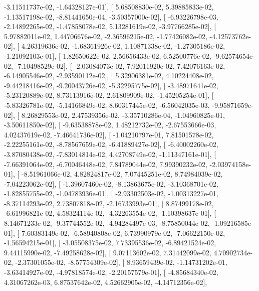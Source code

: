 \documentclass{article}
\begin{document}
         -3.11511737e-02,  -1.64328127e-01],
       [  5.68508830e-02,   5.39885833e-02,  -1.13517198e-02,
         -8.81441650e-04,  -3.50357000e-02],
       [ -6.93226798e-03,  -2.14892265e-02,  -1.47858078e-02,
          5.13281619e-02,  -3.97766285e-02],
       [  5.97882011e-02,   1.44706676e-02,  -2.36596215e-02,
         -1.77426082e-02,  -4.12573762e-02],
       [  4.26319636e-02,  -1.68361926e-02,   1.10871338e-02,
         -1.27305186e-02,  -1.21092103e-01],
       [  1.82650622e-02,   2.56656433e-02,   6.52500776e-02,
         -9.62574654e-02,  -7.10498529e-02],
       [ -2.03084073e-02,   7.92011920e-02,   7.42076163e-02,
         -6.14905546e-02,  -2.93590112e-02],
       [  5.32906381e-02,   4.10224408e-02,  -9.44218416e-02,
         -9.20043726e-02,  -5.32295775e-02],
       [ -3.48971641e-02,  -5.23120889e-02,   8.73113916e-02,
          2.61809909e-02,  -1.45205254e-01],
       [ -5.83326781e-02,  -5.14166849e-02,   8.60317445e-02,
         -6.56042035e-03,  -9.95871659e-02],
       [  8.26829553e-02,   2.47539356e-02,  -3.35710286e-04,
         -1.04960825e-01,  -3.50611850e-02],
       [ -9.63538878e-02,   1.48212732e-02,  -2.67553666e-03,
          4.02437619e-02,  -7.46641736e-02],
       [ -1.04210797e-01,   7.81501578e-02,  -2.22255161e-02,
         -8.78567659e-02,  -6.41889427e-02],
       [ -6.40002260e-02,  -3.87080438e-02,  -7.83014814e-02,
          4.42708749e-02,  -1.11347161e-01],
       [ -7.66391064e-02,  -6.70046448e-02,   7.84789044e-02,
          7.99390232e-02,  -2.03974158e-01],
       [ -8.51961066e-02,   4.82824817e-02,   7.07445251e-02,
          8.74984039e-02,  -7.04223062e-02],
       [ -1.39607460e-02,  -8.13863675e-02,  -3.10368701e-02,
         -1.82855755e-02,  -1.04783936e-01],
       [ -2.93302503e-02,  -1.00313227e-01,  -8.37114293e-02,
          2.73807818e-02,  -2.16733993e-01],
       [  8.87499178e-02,  -6.61996821e-02,   4.58324114e-02,
         -4.32263554e-02,  -1.10398637e-01],
       [  8.14671233e-02,  -9.37744552e-02,  -4.94284497e-03,
         -8.75850044e-02,  -1.09216585e-01],
       [  7.60383149e-02,  -6.58940808e-02,   6.73990979e-02,
         -7.06622150e-02,  -1.56594215e-01],
       [ -3.05508375e-02,   7.73395536e-02,  -6.89421524e-02,
          9.44115990e-02,  -7.49258628e-02],
       [  9.07113602e-02,   7.31442099e-02,   4.70902734e-02,
         -2.37301055e-02,  -8.57754309e-02],
       [  8.93659439e-02,  -1.14731202e-01,  -3.63414927e-02,
         -4.97818574e-02,  -2.20157579e-01],
       [ -4.85684340e-02,   4.31067262e-03,   6.87537642e-02,
          4.52662905e-02,  -4.14712356e-02],
\end{document}
